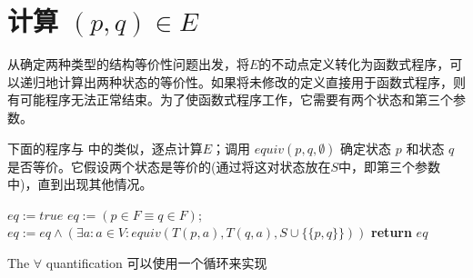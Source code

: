 \section{计算 $ (p,q) \in E $}

从确定两种类型的结构等价性问题出发，将$E$的不动点定义转化为函数式程序，可以递归地计算出两种状态的等价性。如果将未修改的定义直接用于函数式程序，则有可能程序无法正常结束。为了使函数式程序工作，它需要有两个状态和第三个参数。

下面的程序与 \cite{t-Ei91} 中的类似，逐点计算$E$；调用 $equiv(p,q,\emptyset)$ 确定状态 $p$ 和状态 $q$ 是否等价。它假设两个状态是等价的(通过将这对状态放在$S$中，即第三个参数中)，直到出现其他情况。

\begin{algorithm}
    \small
    \begin{algorithmic}[1]
                $eq := true$
                \State $ eq := ( p \in F \equiv q \in F ) $;
                \State $ eq := eq \land (\exists a:a \in V : equiv (T(p,a),T(q,a),S \cup \{ \{ p,q\} \}  ) )  $
            \EndIf
            \State \textbf{return} $eq$
        \EndFunction
    \end{algorithmic}
\end{algorithm}


\newpage
The $\forall$ quantification 可以使用一个循环来实现

